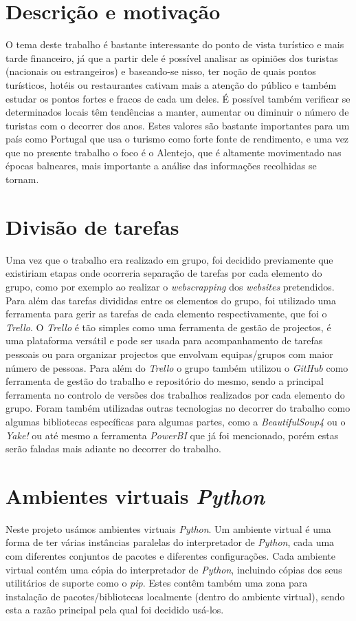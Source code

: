 \section{Descrição e motivação}
O tema deste trabalho é bastante interessante do ponto de vista turístico e mais tarde financeiro, já que a partir dele é possível analisar as opiniões dos turistas (nacionais ou estrangeiros) e baseando-se nisso, ter noção de quais pontos turísticos, hotéis ou restaurantes cativam mais a atenção do público e também estudar os pontos fortes e fracos de cada um deles. É possível também verificar se determinados locais têm tendências a manter, aumentar ou diminuir o número de turistas com o decorrer dos anos. Estes valores são bastante importantes para um país como Portugal que usa o turismo como forte fonte de rendimento, e uma vez que no presente trabalho o foco é o Alentejo, que é altamente movimentado nas épocas balneares, mais importante a análise das informações recolhidas se tornam. 

\section{Divisão de tarefas}
Uma vez que o trabalho era realizado em grupo, foi decidido previamente que existiriam etapas onde ocorreria separação de tarefas por cada elemento do grupo, como por exemplo ao realizar o \textit{webscrapping} dos \textit{websites} pretendidos. Para além das tarefas divididas entre os elementos do grupo, foi utilizado uma ferramenta para gerir as tarefas de cada elemento respectivamente, que foi o \textit{Trello}. O \textit{Trello} é tão simples como uma ferramenta de gestão de projectos, é uma plataforma versátil e pode ser usada para acompanhamento de tarefas pessoais ou para organizar projectos que envolvam equipas/grupos com maior número de pessoas. Para além do \textit{Trello} o grupo também utilizou o \textit{GitHub} como ferramenta de gestão do trabalho e repositório do mesmo, sendo a principal ferramenta no controlo de versões dos trabalhos realizados por cada elemento do grupo. Foram também utilizadas outras tecnologias no decorrer do trabalho como algumas bibliotecas específicas para algumas partes, como a \textit{BeautifulSoup4} ou o \textit{Yake!} ou até mesmo a ferramenta \textit{PowerBI} que já foi mencionado, porém estas serão faladas mais adiante no decorrer do trabalho.

\section{Ambientes virtuais \textit{Python}}

Neste projeto usámos ambientes virtuais \textit{Python}. Um ambiente virtual é uma forma de ter várias instâncias paralelas do interpretador de \textit{Python}, cada uma com diferentes conjuntos de pacotes e diferentes configurações.
Cada ambiente virtual contém uma cópia do interpretador de \textit{Python}, incluindo cópias dos seus utilitários de suporte como o \textit{pip}. Estes contêm também uma zona para instalação de pacotes/bibliotecas localmente (dentro do ambiente virtual), sendo esta a razão principal pela qual foi decidido usá-los.